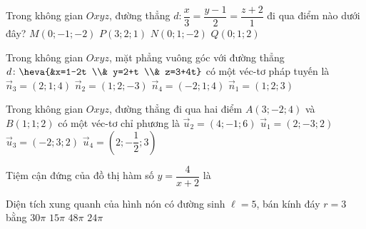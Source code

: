 \begin{ex}%
	Trong không gian $Oxyz$, đường thẳng $d\colon \dfrac{x}{3}=\dfrac{y-1}{2}=\dfrac{z+2}{1}$ đi qua điểm nào dưới đây?
	\choice
	{$M(0 ;-1 ;-2)$}
	{$P(3 ; 2 ; 1)$}
	{\True $N(0 ; 1 ;-2)$}
	{$Q(0 ; 1 ; 2)$}
\end{ex}
\begin{ex}%
	Trong không gian $Oxyz$, mặt phẳng vuông góc với đường thẳng $d\colon \heva{&x=1-2t \\& y=2+t \\& z=3+4t}$ có một véc-tơ pháp tuyến là
	\choice
	{$\overrightarrow{n}_3=(2;1;4)$}
	{$\overrightarrow{n}_2=(1;2;-3)$}
	{\True $\overrightarrow{n}_4=(-2;1;4)$}
	{$\overrightarrow{n}_1=(1;2;3)$}
\end{ex}
\begin{ex}%
	Trong không gian $Oxyz$, đường thẳng đi qua hai điểm $A(3;-2;4)$ và $B(1;1;2)$ có một véc-tơ chỉ phương là
	\choice
	{$\overrightarrow{u}_2=(4;-1;6)$}
	{\True $\overrightarrow{u}_1=(2;-3;2)$}
	{$\overrightarrow{u}_3=(-2;3;2)$}
	{$\overrightarrow{u}_4=\left(2;-\dfrac{1}{2};3\right)$}
\end{ex}

\begin{ex}%
	Tiệm cận đứng của đồ thị hàm số $y=\dfrac{4}{x+2}$ là
\end{ex}

\begin{ex}%
	Diện tích xung quanh của hình nón có đường sinh $\ell=5$, bán kính đáy $r=3$ bằng
	\choice
	{$30 \pi$}
	{\True $15 \pi$}
	{$48 \pi$}
	{$24 \pi$}
\end{ex}

